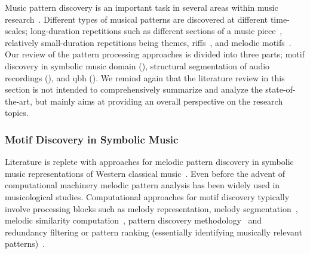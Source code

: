 Music pattern discovery is an important task in several areas within music research~\cite{collins2011modeling,Conklin2010a,Serra2014,nieto2012compressing}. Different types of musical patterns are discovered at different time-scales; long-duration repetitions such as different sections of a music piece~\citep{serra2012unsupervised,Goto06TASLP}, relatively small-duration repetitions being themes, riffs~\citep{Hsu2001a}, and melodic motifs~\citep{collins2011improved}. Our review of the pattern processing approaches is divided into three parts; motif discovery in symbolic music domain (), structural segmentation of audio recordings (), and \gls{qbh} (). We remind again that the literature review in this section is not intended to comprehensively summarize and analyze the state-of-the-art, but mainly aims at providing an overall perspective on the research topics.


\subsubsection{Motif Discovery in Symbolic Music}
\label{sec:motif_in_symbolic_music}

Literature is replete with approaches for melodic pattern discovery in symbolic music representations of Western classical music~\citep{cambouropoulos1997towards,meredith2006point,conklin2001representation,Lartillot2005b}. Even before the advent of computational machinery melodic pattern analysis has been widely used in musicological studies. Computational approaches for motif discovery typically involve processing blocks such as melody representation\citep{meredith2006point}, melody segmentation~\citep{Cambouropoulos2006}, melodic similarity computation~\citep{Cambouropoulos2001,Marsden2012}, pattern discovery methodology~\citep{collins2013siarct,meredith2002algorithms} and redundancy filtering or pattern ranking (essentially identifying musically relevant patterns)~\citep{Lartillot2005,conklin2010discovery}. 

